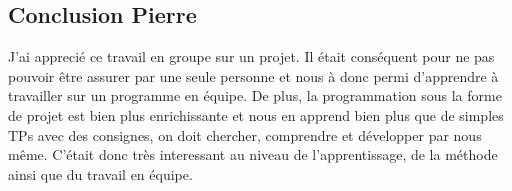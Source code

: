 	\subsection{Conclusion Pierre}
	J'ai apprecié ce travail en groupe sur un projet. Il était conséquent pour ne pas pouvoir être assurer par une seule personne et nous à donc permi d'apprendre à travailler sur un programme en équipe. De plus, la programmation sous la forme de projet est bien plus enrichissante et nous en apprend bien plus que de simples TPs avec des consignes, on doit chercher, comprendre et développer par nous même. C'était donc très interessant au niveau de l'apprentissage, de la méthode ainsi que du travail en équipe.

